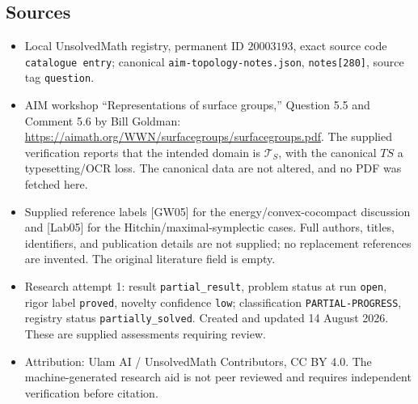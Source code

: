 \documentclass[11pt]{article}
\begin{document}
\subsection{Sources}
\begin{itemize}
\item Local UnsolvedMath registry, permanent ID \(20003193\), exact source code \texttt{catalogue entry}; canonical \texttt{aim-topology-notes.json}, \texttt{notes[280]}, source tag \texttt{question}.
\item AIM workshop ``Representations of surface groups,'' Question 5.5 and Comment 5.6 by Bill Goldman: \url{https://aimath.org/WWN/surfacegroups/surfacegroups.pdf}. The supplied verification reports that the intended domain is \(\mathcal T_S\), with the canonical \(TS\) a typesetting/OCR loss. The canonical data are not altered, and no PDF was fetched here.
\item Supplied reference labels [GW05] for the energy/convex-cocompact discussion and [Lab05] for the Hitchin/maximal-symplectic cases. Full authors, titles, identifiers, and publication details are not supplied; no replacement references are invented. The original literature field is empty.
\item Research attempt 1: result \texttt{partial\_result}, problem status at run \texttt{open}, rigor label \texttt{proved}, novelty confidence \texttt{low}; classification \texttt{PARTIAL-PROGRESS}, registry status \texttt{partially\_solved}. Created and updated 14 August 2026. These are supplied assessments requiring review.
\item Attribution: Ulam AI / UnsolvedMath Contributors, CC BY 4.0. The machine-generated research aid is not peer reviewed and requires independent verification before citation.
\end{itemize}
\end{document}
